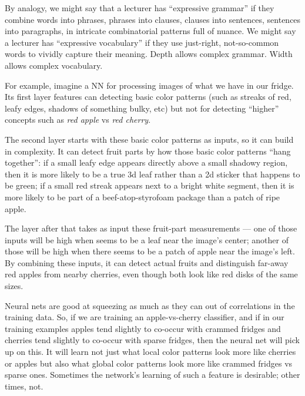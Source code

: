   By analogy, we might say that a lecturer has ``expressive grammar'' if they
  combine words into phrases, phrases into clauses, clauses into sentences,
  sentences into paragraphs, in intricate combinatorial patterns full of
  nuance.  We might say a lecturer has ``expressive vocabulary'' if they use
  just-right, not-so-common words to vividly capture their meaning.  Depth
  allows complex grammar.  Width allows complex vocabulary.

  For example, imagine a NN for processing images of what we have in our
  fridge.  Its first layer features can detecting basic color
  patterns (such as streaks of red, leafy edges, shadows of something bulky,
  etc) but not for detecting ``higher'' concepts such as \emph{red apple} vs
  \emph{red cherry}.

  The second layer starts with these basic color patterns as inputs, so it can
  build in complexity.  It can detect fruit parts by how those basic color
  patterns ``hang together'': if a small leafy edge appears directly above a
  small shadowy region, then it is more likely to be a true 3d leaf rather than
  a 2d sticker that happens to be green; if a small red streak appears next to
  a bright white segment, then it is more likely to be part of a
  beef-atop-styrofoam package than a patch of ripe apple.

  The layer after that takes as input these fruit-part measurements --- one of
  those inputs will be high when seems to be a leaf near the image's center;
  another of those will be high when there seems to be a patch of apple near
  the image's left.  By combining these inputs, it can detect actual fruits and
  distinguish far-away red apples from nearby cherries, even though both look
  like red disks of the same sizes.

  Neural nets are good at squeezing as much as they can out of correlations in
  the training data.  So, if we are training an apple-vs-cherry classifier, and
  if in our training examples apples tend slightly to co-occur with crammed
  fridges
  and cherries tend slightly to co-occur with sparse fridges, then the neural
  net will pick up on this.  It will learn not just what local color patterns
  look more like cherries or apples but also what global color patterns look
  more like crammed fridges vs sparse ones.  Sometimes the network's learning
  of such a feature is desirable; other times, not.


